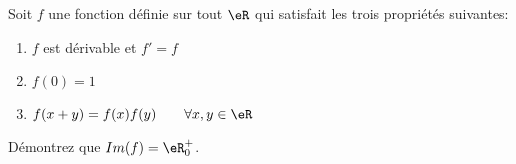 
\begin{exercice}\label{exo0099}


Soit $f$ une fonction définie sur tout $\eR$ qui satisfait les trois propriétés suivantes:
\begin{enumerate}
\item
$f$ est dérivable et $f'=f$
\item
$f(0) = 1$
\item
$f(x+y)=f(x)f(y) \qquad \forall x,y \in \eR$
\end{enumerate}
Démontrez que $Im(f) = \eR_0^+$.

\end{exercice}

